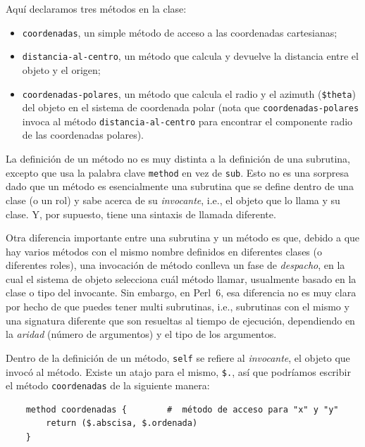 Aquí declaramos tres métodos en la clase:
\begin{itemize}
\item {\tt coordenadas}, un simple método de acceso a
las coordenadas cartesianas;

\item{\tt distancia-al-centro}, un método que calcula y devuelve
la distancia entre el objeto y el origen;

\item{\tt coordenadas-polares}, un método que calcula el radio y 
el azimuth (\verb|$theta|) del objeto en el sistema de coordenada
polar (nota que {\tt coordenadas-polares} invoca al método 
{\tt distancia-al-centro} para encontrar el componente radio de las 
coordenadas polares).
\end{itemize}

La definición de un método no es muy distinta a la definición
de una subrutina, excepto que usa la palabra clave {\tt method}
en vez de {\tt sub}. Esto no es una sorpresa dado que un 
método es esencialmente una subrutina que se define dentro de
una clase (o un rol) y sabe acerca de su \emph{invocante}, i.e.,
el objeto que lo llama y su clase. Y, por supuesto, tiene una
sintaxis de llamada diferente.

Otra diferencia importante entre una subrutina y un método es
que, debido a que hay varios métodos con el mismo nombre
definidos en diferentes clases (o diferentes roles), una 
invocación de método conlleva un fase de \emph{despacho},
en la cual el sistema de objeto selecciona cuál método llamar,
usualmente basado en la clase o tipo del invocante. Sin embargo,
en Perl~6, esa diferencia no es muy clara por hecho de que 
puedes tener multi subrutinas, i.e., subrutinas con el mismo
y una signatura diferente que son resueltas al tiempo de ejecución,
dependiendo en la \emph{aridad} (número de argumentos) y el 
tipo de los argumentos.

Dentro de la definición de un método, {\tt self}
se refiere al \emph{invocante}, el objeto que invocó
al método. Existe un atajo para el mismo, \verb|$.|,
así que podríamos escribir el método {\tt coordenadas}
de la siguiente manera:

\begin{verbatim}
    method coordenadas {        #  método de acceso para "x" y "y"
        return ($.abscisa, $.ordenada)
    }
\end{verbatim}

